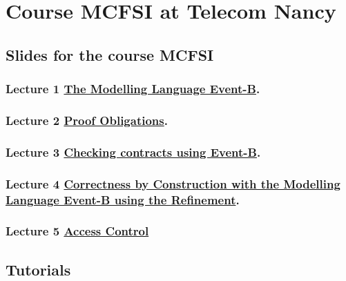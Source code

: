\documentclass[ 12pt]{article}
\begin{document}
\section{Course MCFSI  at Telecom Nancy}
\label{sec:course-mcfsi-at}


\subsection{Slides for the course MCFSI}
\label{sec:slides}



\subsubsection{Lecture 1
  \href{http://mery54.github.io/teaching/mosos/lecturesnotes/mcfsi-lect1.pdf}{The 
    Modelling Language Event-B}. 
}


\subsubsection{Lecture 2
    \href{http://mery54.github.io/teaching/mosos/lecturesnotes/mcfsi-po.pdf}{Proof
      Obligations}.}


  
\subsubsection{Lecture 3
    \href{http://mery54.github.io/teaching/mosos/lecturesnotes/mcfsi-verification.pdf}{Checking
      contracts using Event-B}.}

  

  \subsubsection{Lecture 4
    \href{http://mery54.github.io/teaching/mosos/lecturesnotes/mcfsi-lect2.pdf}{Correctness by Construction with the  
      Modelling Language Event-B using the Refinement}.}
\label{sec:lect-3-hrefhttp:m}


\subsubsection{ Lecture 5 
    \href{http://mery54.github.io/teaching/mosos/lecturesnotes/mcfsi-lect3.pdf}{Access 
      Control }
}



\subsection{Tutorials}
\end{document}
